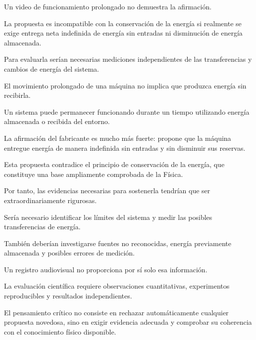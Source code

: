 \begin{respuesta}
Un video de funcionamiento prolongado no demuestra la afirmación.

La propuesta es incompatible con la conservación de la energía si realmente se exige entrega neta indefinida de energía sin entradas ni disminución de energía almacenada.

Para evaluarla serían necesarias mediciones independientes de las transferencias y cambios de energía del sistema.
\end{respuesta}

\begin{explicacion}
El movimiento prolongado de una máquina no implica que produzca energía sin recibirla.

Un sistema puede permanecer funcionando durante un tiempo utilizando energía almacenada o recibida del entorno.

La afirmación del fabricante es mucho más fuerte: propone que la máquina entregue energía de manera indefinida sin entradas y sin disminuir sus reservas.

Esta propuesta contradice el principio de conservación de la energía, que constituye una base ampliamente comprobada de la Física.

Por tanto, las evidencias necesarias para sostenerla tendrían que ser extraordinariamente rigurosas.

Sería necesario identificar los límites del sistema y medir las posibles transferencias de energía.

También deberían investigarse fuentes no reconocidas, energía previamente almacenada y posibles errores de medición.

Un registro audiovisual no proporciona por sí solo esa información.

La evaluación científica requiere observaciones cuantitativas, experimentos reproducibles y resultados independientes.

El pensamiento crítico no consiste en rechazar automáticamente cualquier propuesta novedosa, sino en exigir evidencia adecuada y comprobar su coherencia con el conocimiento físico disponible.
\end{explicacion}


